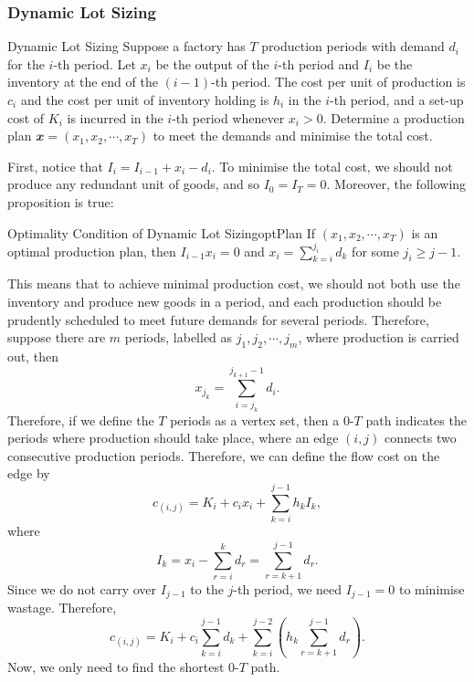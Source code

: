 \documentclass[math, code]{amznotes}
\theoremstyle{remark}
\begin{document}
\subsubsection{Dynamic Lot Sizing}
\begin{genbox}{Dynamic Lot Sizing}
    Suppose a factory has $T$ production periods with demand $d_i$ for the $i$-th period. Let $x_i$ be the output of the $i$-th period and $I_i$ be the inventory at the end of the $(i - 1)$-th period. The cost per unit of production is $c_i$ and the cost per unit of inventory holding is $h_i$ in the $i$-th period, and a set-up cost of $K_i$ is incurred in the $i$-th period whenever $x_i > 0$. Determine a production plan $\mathbfit{x} = (x_1, x_2, \cdots, x_T)$ to meet the demands and minimise the total cost.
\end{genbox}
First, notice that $I_{i} = I_{i - 1} + x_i - d_i$. To minimise the total cost, we should not produce any redundant unit of goods, and so $I_0 = I_T = 0$. Moreover, the following proposition is true:
\begin{probox}{Optimality Condition of Dynamic Lot Sizing}{optPlan}
    If $(x_1, x_2, \cdots, x_T)$ is an optimal production plan, then $I_{i - 1}x_i = 0$ and $x_i = \sum_{k = i}^{j_i}d_k$ for some $j_i \geq j - 1$.
\end{probox}
This means that to achieve minimal production cost, we should not both use the inventory and produce new goods in a period, and each production should be prudently scheduled to meet future demands for several periods. Therefore, suppose there are $m$ periods, labelled as $j_1, j_2, \cdots, j_m$, where production is carried out, then 
\begin{equation*}
    x_{j_k} = \sum_{i = j_k}^{j_{k + 1} - 1}d_i.
\end{equation*}
Therefore, if we define the $T$ periods as a vertex set, then a $0$-$T$ path indicates the periods where production should take place, where an edge $(i, j)$ connects two consecutive production periods. Therefore, we can define the flow cost on the edge by 
\begin{equation*}
    c_{(i, j)} = K_i + c_ix_i + \sum_{k = i}^{j - 1}h_kI_k,
\end{equation*}
where
\begin{equation*}
    I_k = x_i - \sum_{r = i}^{k}d_r = \sum_{r = k + 1}^{j - 1}d_r.
\end{equation*}
Since we do not carry over $I_{j - 1}$ to the $j$-th period, we need $I_{j - 1} = 0$ to minimise wastage. Therefore, 
\begin{equation*}
    c_{(i, j)} = K_i + c_i\sum_{k = i}^{j - 1}d_k + \sum_{k = i}^{j - 2}\left(h_k\sum_{r = k + 1}^{j - 1}d_r\right).
\end{equation*}
Now, we only need to find the shortest $0$-$T$ path.
\end{document}
